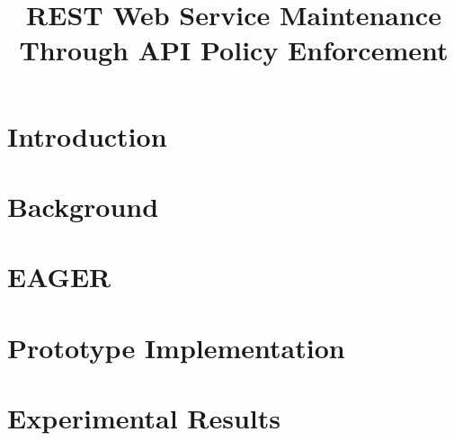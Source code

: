 \documentclass[conference]{IEEEtran}
\begin{document}
\title{REST Web Service Maintenance Through API Policy Enforcement}

\author{
}\maketitle

\begin{abstract}

\end{abstract}




\section{Introduction}
\label{sec:intro}


\section{Background}
\label{sec:bg}


\section{EAGER}
\label{sec:eager}


\section{Prototype Implementation}
\label{sec:prototype_impl}


\section{Experimental Results}
\label{sec:results}

\end{document}
